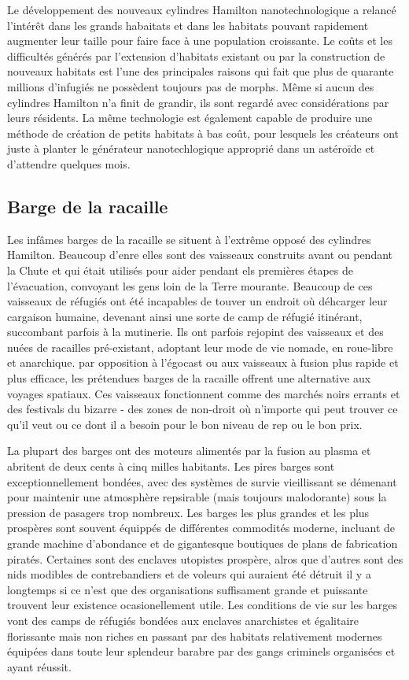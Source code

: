                Le développement des nouveaux cylindres Hamilton nanotechnologique a relancé l'intérêt dans les grands habaitats et dans les habitats pouvant rapidement augmenter leur taille pour faire face à une population croissante. Le coûts et les difficultés générés par l'extension d'habitats existant ou par la construction de nouveaux habitats est l'une des principales raisons qui fait que plus de quarante millions d'infugiés ne possèdent toujours pas de morphs. Même si aucun des cylindres Hamilton n'a finit de grandir, ils sont regardé avec considérations par leurs résidents. La même technologie est également capable de produire une méthode de création de petits habitats à bas coût, pour lesquels les créateurs ont juste à planter le générateur nanotechlogique approprié dans un astéroïde et d'attendre quelques mois. 

               \subsection{Barge de la racaille} \label{sec:scum-barges} 

               Les infâmes barges de la racaille se situent à l'extrême opposé des cylindres Hamilton. Beaucoup d'enre elles sont des vaisseaux construits avant ou pendant la Chute et qui était utilisés pour aider pendant els premières étapes de l'évacuation, convoyant les gens loin de la Terre mourante. Beaucoup de ces vaisseaux de réfugiés ont été incapables de touver un endroit où déhcarger leur cargaison humaine, devenant ainsi une sorte de camp de réfugié itinérant, succombant parfois à la mutinerie. Ils ont parfois rejopint des vaisseaux et des nuées de racailles pré-existant, adoptant leur mode de vie nomade, en roue-libre et anarchique. par opposition à l'égocast ou aux vaisseaux à fusion plus rapide et plus efficace, les prétendues barges de la racaille offrent une alternative aux voyages spatiaux. Ces vaisseaux fonctionnent comme des marchés noirs errants et des festivals du bizarre - des zones de non-droit où n'importe qui peut trouver ce qu'il veut ou ce dont il a besoin pour le bon niveau de rep ou le bon prix. 

               La plupart des barges ont des moteurs alimentés par la fusion au plasma et abritent de deux cents à cinq milles habitants. Les pires barges sont exceptionnellement bondées, avec des systèmes de survie vieillissant se démenant pour maintenir une atmosphère repsirable (mais toujours malodorante) sous la pression de pasagers trop nombreux. Les barges les plus grandes et les plus prospères sont souvent équippés de différentes commodités moderne, incluant de grande machine d'abondance et de gigantesque boutiques de plans de fabrication piratés. Certaines sont des enclaves utopistes prospère, alros que d'autres sont des nids modibles de contrebandiers et de voleurs qui auraient été détruit il y a longtemps si ce n'est que des organisations suffisament grande et puissante trouvent leur existence ocasionellement utile. Les conditions de vie sur les barges vont des camps de réfugiés bondées aux enclaves anarchistes et égalitaire florissante mais non riches en passant par des habitats relativement modernes équipées dans toute leur splendeur barabre par des gangs criminels organisées et ayant réussit. 

